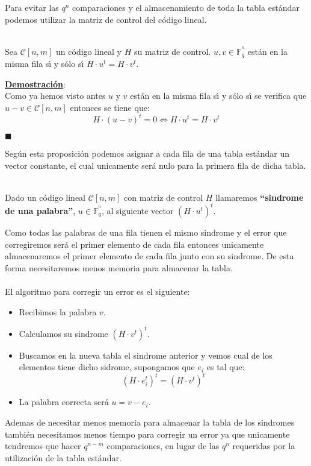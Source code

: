 Para evitar las $q^n$ comparaciones y el almacenamiento de toda la tabla
est\'andar podemos utilizar la matriz de control del c\'odigo lineal.
\begin{proposicion}
\ \\
Sea $\mathcal{C}[n,m]$ un c\'odigo lineal y $H$ su matriz de control. 
$u,v\in \mathbb{F}_q^{^n}$ est\'an en la misma fila s\'{\i} y s\'olo s\'{\i}
$H\cdot u^t = H\cdot v^t$.
\end{proposicion}
\underline{\textbf{Demostraci\'on}}:\\
Como ya hemos visto antes $u$ y $v$ est\'an en la misma fila s\'{\i} y s\'olo 
s\'{\i} se verifica que $u-v\in \mathcal{C}[n,m]$ entonces se tiene que:
\begin{displaymath}
H\cdot (u-v)^t = 0 \Longleftrightarrow H\cdot u^t=H\cdot v^t
\end{displaymath}
\begin{flushright}
$\blacksquare$
\end{flushright}
Seg\'un esta proposici\'on podemos asignar a cada fila de una tabla est\'andar
un vector constante, el cual unicamente ser\'a nulo para la primera fila de
dicha tabla.
\begin{definicion}
\ \\
Dado un c\'odigo lineal $\mathcal{C}[n,m]$ con matriz de control $H$ llamaremos
\textbf{``sindrome de una palabra''}, $u\in \mathbb{F}_q^{^n}$, al siguiente
vector $(H\cdot u^t)^t$.
\end{definicion}
Como todas las palabras de una fila tienen el mismo sindrome y el error que
corregiremos ser\'a el primer elemento de cada fila entonces unicamente
almacenaremos el primer elemento de cada fila junto con su sindrome. De esta
forma necesitaremos menos memoria para almacenar la tabla.\\ \\
%
El algoritmo para corregir un error es el siguiente:
\begin{itemize}
\item Recibimos la palabra $v$.
\item Calculamos su sindrome $(H\cdot v^t)^t$.
\item Buscamos en la nueva tabla el sindrome anterior y vemos cual de los
elementos tiene dicho sidrome, supongamos que $e_i$ es tal que:
$$(H\cdot e_i^t)^t=(H\cdot v^t)^t$$ 
\item La palabra correcta ser\'a $u=v-e_i$.
\end{itemize}
Ademas de necesitar menos memoria para almacenar la tabla de los sindromes
tambi\'en necesitamos menos tiempo para corregir un error ya que unicamente
tendremos que hacer $q^{n-m}$ comparaciones, en lugar de las $q^n$ requeridas
por la utilizaci\'on de la tabla est\'andar.
